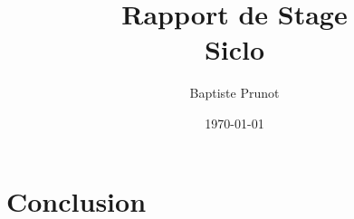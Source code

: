 \documentclass[11pt]{report}
\author{Baptiste Prunot}
\title{Rapport de Stage\\Siclo}
\date{\today}
\begin{document}
    \frontpage
    \tableofcontents
    \pagebreak
    
    
    
    \chapter{Conclusion}
\end{document}
